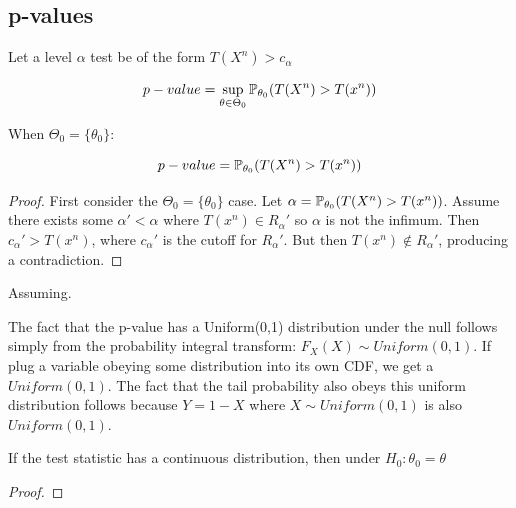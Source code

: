 \documentclass[10pt]{article}
\begin{document}
\subsection{p-values}

\begin{definition}
\end{definition}

\begin{theorem}
Let a level $\alpha$ test be of the form $T(X^n) > c_\alpha$

\[p-value = \sup_{\theta \in \Theta_0} \P_{\theta_0}(T(X^n) > T(x^n))\]

When $\Theta_0 = \{ \theta_0 \}$:

\[p-value = \P_{\theta_0}(T(X^n) > T(x^n))\]
\end{theorem}

\begin{proof}
    First consider the $\Theta_0 = \{ \theta_0 \}$ case. Let $\alpha =
    \P_{\theta_0}(T(X^n) > T(x^n))$. Assume there exists some $\alpha' <
    \alpha$ where $T(x^n) \in R_\alpha'$ so $\alpha$ is not the infimum.
    Then $c_\alpha' > T(x^n)$, where $c_\alpha'$ is the cutoff for
    $R_\alpha'$. But then $T(x^n) \notin R_\alpha'$, producing a contradiction.
\end{proof}

\begin{theorem}
    Assuming.
\end{theorem}

\begin{note}
    The fact that the p-value has a Uniform(0,1) distribution under the null
    follows simply from the probability integral transform: $F_X(X)
    \sim Uniform(0, 1)$. If plug a variable obeying some distribution into its
    own CDF, we get a $Uniform(0, 1)$. The fact that the tail probability also
    obeys this uniform distribution follows because $Y = 1 - X$ where $X \sim
    Uniform(0, 1)$ is also $Uniform(0, 1)$.
\end{note}

\begin{theorem}
    If the test statistic has a continuous distribution, then under $H_0:
    \theta_0 = \theta$
\end{theorem}

\begin{proof}
\end{proof}
\end{document}
